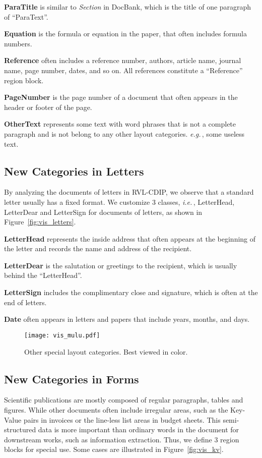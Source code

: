 \documentclass[10pt,twocolumn,letterpaper]{article}
\def\eg{\emph{e.g.}\,}
\def\ie{\emph{i.e.}\,}
\begin{document}
\noindent
\textbf{ParaTitle} is similar to \textit{Section} in DocBank, which is the title of one paragraph of ``ParaText''.


\noindent
\textbf{Equation} is the formula or equation in the paper, that often includes formula numbers.

\noindent
\textbf{Reference} often includes a reference number, authors, article name,  journal name, page number, dates, and so on.
All references constitute a ``Reference'' region block.

\noindent
\textbf{PageNumber} is the page number of a document that often appears in the header or footer of the page.

\noindent
\textbf{OtherText} represents some text with word phrases that is not a complete paragraph and is not belong to any other layout categories.
\eg, some useless text.


\subsection{New Categories in Letters} 
By analyzing the documents of letters in RVL-CDIP,  we observe that a standard letter usually has a fixed format.
We customize $3$ classes, \ie, LetterHead, LetterDear and LetterSign for documents of letters, as shown in Figure~\ref{fig:vis_letters}.

\noindent
\textbf{LetterHead} represents the inside address that often appears at the beginning of the letter and records the name and address of the recipient.

\noindent
\textbf{LetterDear} is the salutation or greetings to the recipient, which is usually behind the ``LetterHead''.

\noindent
\textbf{LetterSign} includes the complimentary close and signature, which is often at the end of letters.

\noindent
\textbf{Date} often appears in letters and papers that include years, months, and days.

\begin{figure}[!htp]\centering
\texttt{[image: vis\_mulu.pdf]}
\caption{Other special layout categories. Best viewed in color.}
 \label{fig:vis_mulu}
\end{figure} 

\subsection{New Categories in Forms} 
Scientific publications are mostly composed of regular paragraphs, tables and figures.
While other documents often include irregular areas, such as the Key-Value pairs in  invoices or the line-less list areas in budget sheets.
This semi-structured data is more important than ordinary words in the document for downstream works, such as information extraction.
Thus, we define $3$ region blocks for special use.
Some cases are illustrated in Figure~\ref{fig:vis_kv}.
\end{document}
